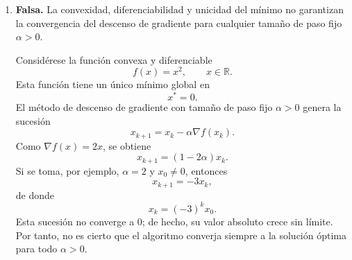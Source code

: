 \begin{enumerate}
    \item \textbf{Falsa.} La convexidad, diferenciabilidad y unicidad del mínimo no garantizan la convergencia del descenso de gradiente para cualquier tamaño de paso fijo $\alpha>0$.

    Considérese la función convexa y diferenciable
    \[
        f(x)=x^2,
        \qquad x\in\mathbb{R}.
    \]
    Esta función tiene un único mínimo global en
    \[
        x^*=0.
    \]
    El método de descenso de gradiente con tamaño de paso fijo $\alpha>0$ genera la sucesión
    \[
        x_{k+1}=x_k-\alpha \nabla f(x_k).
    \]
    Como $\nabla f(x)=2x$, se obtiene
    \[
        x_{k+1}=(1-2\alpha)x_k.
    \]
    Si se toma, por ejemplo, $\alpha=2$ y $x_0\neq 0$, entonces
    \[
        x_{k+1}=-3x_k,
    \]
    de donde
    \[
        x_k=(-3)^k x_0.
    \]
    Esta sucesión no converge a $0$; de hecho, su valor absoluto crece sin límite. Por tanto, no es cierto que el algoritmo converja siempre a la solución óptima para todo $\alpha>0$.
\end{enumerate}
